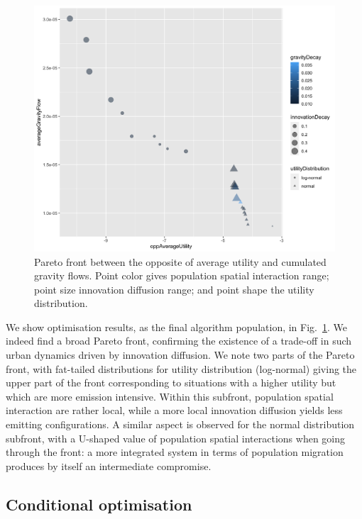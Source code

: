 \documentclass{article}
\begin{document}
\begin{figure}
	\centering
	\includegraphics[width=\linewidth]{figures/pareto-oppAverageUtility-averageGravityFlow_color-gravityDecay_size-innovationDecay_shape-utilityDistribution.png}
	\caption{Pareto front between the opposite of average utility and cumulated gravity flows. Point color gives population spatial interaction range; point size innovation diffusion range; and point shape the utility distribution.\label{fig:fig1}}
\end{figure}

We show optimisation results, as the final algorithm population, in Fig.~\ref{fig:fig1}. We indeed find a broad Pareto front, confirming the existence of a trade-off in such urban dynamics driven by innovation diffusion. We note two parts of the Pareto front, with fat-tailed distributions for utility distribution (log-normal) giving the upper part of the front corresponding to situations with a higher utility but which are more emission intensive. Within this subfront, population spatial interaction are rather local, while a more local innovation diffusion yields less emitting configurations. A similar aspect is observed for the normal distribution subfront, with a U-shaped value of population spatial interactions when going through the front: a more integrated system in terms of population migration produces by itself an intermediate compromise.






\subsection{Conditional optimisation}
\end{document}
